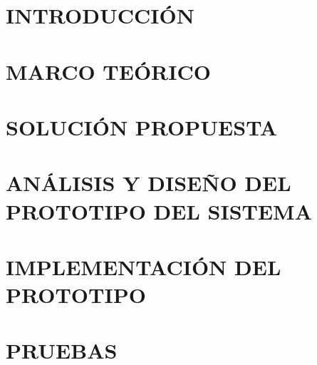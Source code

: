 \documentclass[12pt]{article}
\begin{document}


\newpage


\setcounter{page}{1}
\renewcommand{\thepage}{\arabic{page}}

\section{INTRODUCCIÓN}


\newpage
\section{MARCO TEÓRICO}


\newpage
\section{SOLUCIÓN PROPUESTA}


\newpage
\section{ANÁLISIS Y DISEÑO DEL PROTOTIPO DEL SISTEMA}


\newpage
\section{IMPLEMENTACIÓN DEL PROTOTIPO}


\newpage
\section{PRUEBAS}

\end{document}
